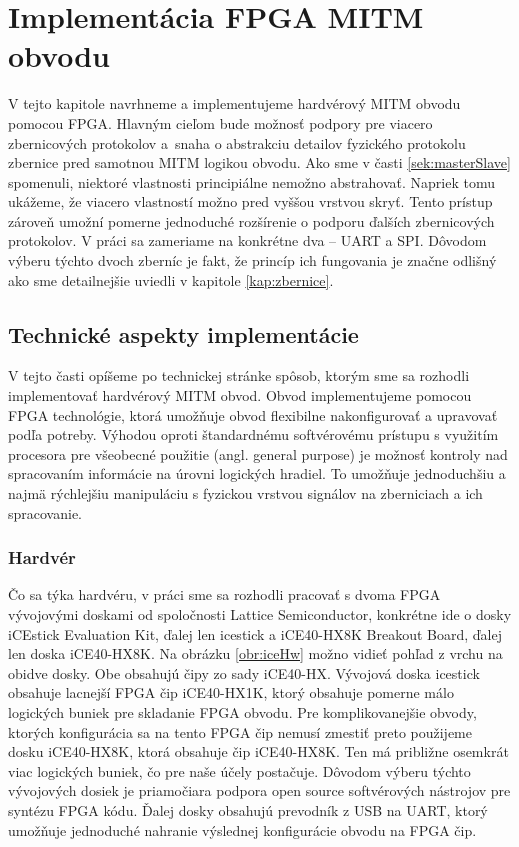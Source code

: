 \chapter{Implementácia FPGA MITM obvodu}
\label{kap:implementacia}

V tejto kapitole navrhneme a implementujeme hardvérový MITM obvodu pomocou FPGA. Hlavným cieľom bude možnosť podpory pre viacero zbernicových protokolov a~snaha o abstrakciu detailov fyzického protokolu zbernice pred samotnou MITM logikou obvodu. Ako sme v časti \ref{sek:masterSlave} spomenuli, niektoré vlastnosti principiálne nemožno abstrahovať. Napriek tomu ukážeme, že viacero vlastností možno pred vyššou vrstvou skryť. Tento prístup zároveň umožní pomerne jednoduché rozšírenie o podporu ďalších zbernicových protokolov. V práci sa zameriame na konkrétne dva -- UART a SPI. Dôvodom výberu týchto dvoch zberníc je fakt, že princíp ich fungovania je značne odlišný ako sme detailnejšie uviedli v kapitole \ref{kap:zbernice}.

\section{Technické aspekty implementácie}
V tejto časti opíšeme po technickej stránke spôsob, ktorým sme sa rozhodli implementovať hardvérový MITM obvod. Obvod implementujeme pomocou FPGA technológie, ktorá umožňuje obvod flexibilne nakonfigurovať a upravovať podľa potreby. Výhodou oproti štandardnému softvérovému prístupu s využitím procesora pre všeobecné použitie (angl. general purpose) je možnosť kontroly nad spracovaním informácie na úrovni logických hradiel. To umožňuje jednoduchšiu a najmä rýchlejšiu manipuláciu s fyzickou vrstvou signálov na zberniciach a ich spracovanie.

\subsection{Hardvér}
Čo sa týka hardvéru, v práci sme sa rozhodli pracovať s dvoma FPGA vývojovými doskami od spoločnosti Lattice Semiconductor, konkrétne ide o dosky iCEstick Evaluation Kit, ďalej len icestick a iCE40-HX8K Breakout Board, ďalej len doska iCE40-HX8K. Na obrázku \ref{obr:iceHw} možno vidieť pohľad z vrchu na obidve dosky. Obe obsahujú čipy zo sady iCE40-HX. Vývojová doska icestick obsahuje lacnejší FPGA čip iCE40-HX1K, ktorý obsahuje pomerne málo logických buniek pre skladanie FPGA obvodu. Pre komplikovanejšie obvody, ktorých konfigurácia sa na tento FPGA čip nemusí zmestiť preto použijeme dosku iCE40-HX8K, ktorá obsahuje čip iCE40-HX8K. Ten má približne osemkrát viac logických buniek, čo pre naše účely postačuje. Dôvodom výberu týchto vývojových dosiek je priamočiara podpora open source softvérových nástrojov pre syntézu FPGA kódu. Ďalej dosky obsahujú prevodník z USB na UART, ktorý umožňuje jednoduché nahranie výslednej konfigurácie obvodu na FPGA čip.

